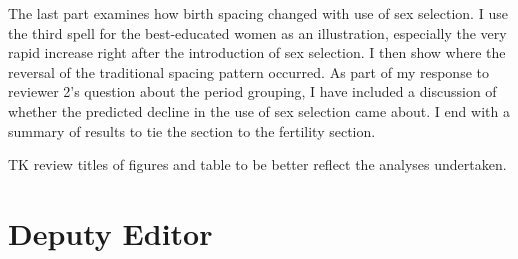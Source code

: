 \documentclass[letterpaper,12pt]{article}
\begin{document}
\begin{enumerate}
The last part examines how birth spacing changed with use of sex selection.
I use the third spell for the best-educated women as an illustration, especially the
very rapid increase right after the introduction of sex selection.
I then show where the reversal of the traditional spacing pattern occurred.
As part of my response to reviewer 2's question about the period grouping, I have 
included a discussion of whether the predicted decline in the use of sex selection
came about.
I end with a summary of results to tie the section to the fertility section.




TK review titles of figures and table to be better reflect the
analyses undertaken.


\end{enumerate}


\section*{Deputy Editor}
\end{document}
